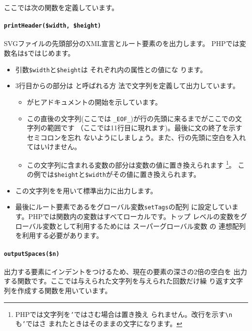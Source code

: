 \begin{itemize}
ここでは次の関数を定義しています。
\paragraph{\texttt{printHeader(\$width, \$height)}}
SVGファイルの先頭部分のXML宣言とルート要素のを出力します。
PHPでは変数名は\texttt{\$}ではじめます。
\begin{itemize}
 \item 引数\texttt{\$width}と\texttt{\$height}は
       それぞれ内の属性との値にな
       ります。
 \item 3行目からの部分は
       と呼ばれる方
       法で文字列を定義して出力しています。
\begin{itemize}
\item  \ElmP{<<<}がヒアドキュメントの開始を示しています。
 \item  この直後の文字列(ここでは
       \texttt{\_EOF\_})が行の先頭に来るまでがここでの文字列の範囲です
       （ここでは11行目に現れます)。最後に文の終了を示すセミコロンを忘れ
	ないようにしましょう。また、行の先頭に空白を入れてはいけません。
 \item この文字列に含まれる変数の部分は変数の値に置き換えられます
       \footnote{PHPでは文字列を\texttt{'}ではさむ場合は置き換え
       られません。改行を示す\texttt{\textbackslash n}も\texttt{'}ではさ
       まれたときはそのままの文字になります。}。
       この例では\texttt{\$height}と\texttt{\$width}がその値に置き換えられます。
\end{itemize}
 \item この文字列をを用いて標準出力に出力します。
 \item 最後にルート要素であるをグローバル変数\texttt{setTags}の配列
       に設定しています。PHPでは関数内の変数はすべてローカルです。トップ
       レベルの変数をグローバル変数として利用するためには
       {スーパーグローバル変数}
の
       連想配列を利用する必要があります。
\end{itemize}       
\paragraph{\texttt{outputSpaces(\$n)}}
       出力する要素にインデントをつけるため、現在の要素の深さの2倍の空白を
       出力する関数です。ここでは与えられた文字列を与えられた回数だけ繰
       り返す文字列を作成する関数を用いています。

\end{itemize}
